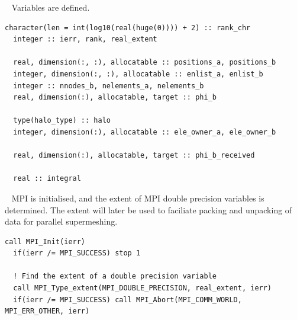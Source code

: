 \documentclass{article}
\begin{document}
~\newline
Variables are defined.
\begin{lstlisting}[language=FORTRAN]
  character(len = int(log10(real(huge(0)))) + 2) :: rank_chr
  integer :: ierr, rank, real_extent
  
  real, dimension(:, :), allocatable :: positions_a, positions_b
  integer, dimension(:, :), allocatable :: enlist_a, enlist_b
  integer :: nnodes_b, nelements_a, nelements_b
  real, dimension(:), allocatable, target :: phi_b
  
  type(halo_type) :: halo
  integer, dimension(:), allocatable :: ele_owner_a, ele_owner_b
  
  real, dimension(:), allocatable, target :: phi_b_received
  
  real :: integral
\end{lstlisting}

~\newline
MPI is initialised, and the extent of MPI double precision variables is
determined. The extent will later be used to faciliate packing and unpacking of
data for parallel supermeshing.
\begin{lstlisting}[language=FORTRAN]
  call MPI_Init(ierr)
  if(ierr /= MPI_SUCCESS) stop 1
  
  ! Find the extent of a double precision variable
  call MPI_Type_extent(MPI_DOUBLE_PRECISION, real_extent, ierr)
  if(ierr /= MPI_SUCCESS) call MPI_Abort(MPI_COMM_WORLD, MPI_ERR_OTHER, ierr)
\end{lstlisting}
\end{document}
